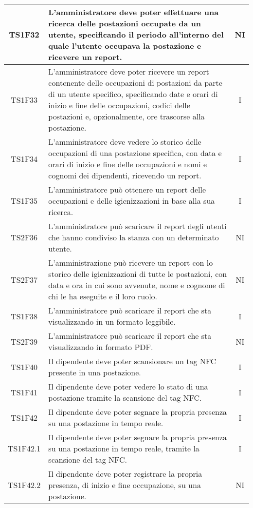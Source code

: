 \begin{center}
\begin{longtable}{|c|p{10cm}|c|}
			\hline
			TS1F32 & L'amministratore deve poter effettuare una ricerca delle postazioni occupate da un utente, specificando il periodo all'interno del quale l'utente occupava la postazione e ricevere un report. & NI \\	
			\hline
			TS1F33 & L'amministratore deve poter ricevere un report contenente delle occupazioni di postazioni da parte di un utente specifico, specificando date e orari di inizio e fine delle occupazioni, codici delle postazioni e, opzionalmente, ore trascorse alla postazione. & I \\	
			\hline
			TS1F34 & L'amministratore deve vedere lo storico delle occupazioni di una postazione specifica, con data e orari di inizio e fine delle occupazioni e nomi e cognomi dei dipendenti, ricevendo un report. & I \\			
			\hline
			TS1F35 & L'amministratore può ottenere un report delle
			occupazioni e delle igienizzazioni in base alla sua ricerca. & I \\		
			\hline		
			TS2F36 & L'amministratore può scaricare il report degli utenti che hanno condiviso la stanza con un determinato utente. & NI \\		
			\hline
			TS2F37 & L'amministrazione può ricevere un report con lo storico delle igienizzazioni di tutte le postazioni, con data e ora in cui sono avvenute, nome e cognome di chi le ha eseguite e il loro ruolo. & NI \\	
			\hline
			TS1F38 & L'amministratore può scaricare il report che sta visualizzando in un formato leggibile. & I \\	
			\hline
			TS2F39 & L'amministratore può scaricare il report che sta visualizzando in formato PDF. & NI \\	
			\hline			
			TS1F40 & Il dipendente deve poter scansionare un tag NFC presente in una postazione. & I \\	
			\hline
			TS1F41 & Il dipendente deve poter vedere lo stato di una postazione tramite la scansione del tag NFC. & I \\	
			\hline
			TS1F42 & Il dipendente deve poter segnare la propria presenza su una postazione in tempo reale. & I \\	
			\hline			
			TS1F42.1 & Il dipendente deve poter segnare la propria presenza su una postazione in tempo reale, tramite la scansione del tag NFC. & I \\	
			\hline
			TS1F42.2 & Il dipendente deve poter registrare la propria presenza, di inizio e fine occupazione, su una postazione. & NI \\		

\end{longtable}
\end{center}
